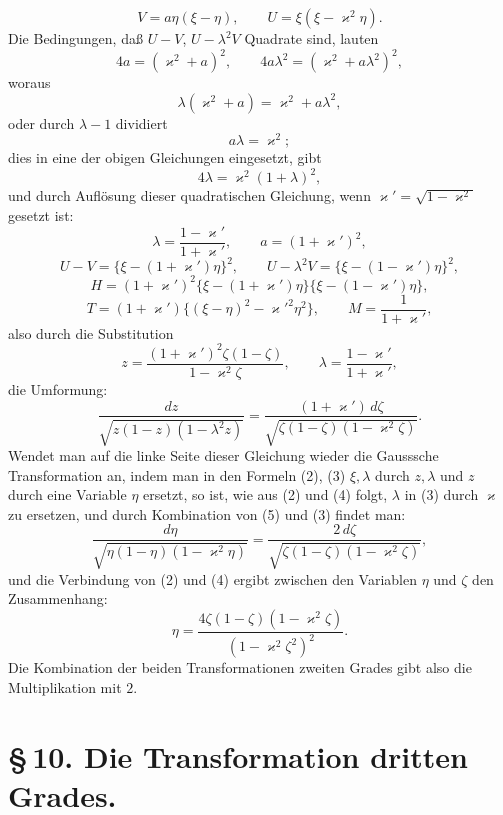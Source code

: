 \documentclass[11pt]{article}
\begin{document}
\[
V=a\eta(\xi-\eta),\qquad U=\xi(\xi-\varkappa^2\eta).
\]
Die Bedingungen, daß $U-V$, $U-\lambda^2V$ Quadrate sind, lauten
\[
4a=(\varkappa^2+a)^2,\qquad 4a\lambda^2=(\varkappa^2+a\lambda^2)^2,
\]
woraus
\[
\lambda(\varkappa^2+a)=\varkappa^2+a\lambda^2,
\]
oder durch $\lambda-1$ dividiert
\[
a\lambda=\varkappa^2;
\]
dies in eine der obigen Gleichungen eingesetzt, gibt
\[
4\lambda=\varkappa^2(1+\lambda)^2,
\]
und durch Auflösung dieser quadratischen Gleichung, wenn $\varkappa'=\sqrt{1-\varkappa^2}$ gesetzt ist:
\[
\lambda=\frac{1-\varkappa'}{1+\varkappa'},\qquad
a=(1+\varkappa')^2,
\]
\[
U-V=\{\xi-(1+\varkappa')\eta\}^2,\qquad
U-\lambda^2V=\{\xi-(1-\varkappa')\eta\}^2,
\]
\[
H=(1+\varkappa')^2\{\xi-(1+\varkappa')\eta\}\{\xi-(1-\varkappa')\eta\},
\]
\[
T=(1+\varkappa')\{(\xi-\eta)^2-\varkappa'^2\eta^2\},\qquad
M=\frac1{1+\varkappa'},
\]
also durch die Substitution
\begin{equation}
z=\frac{(1+\varkappa')^2\zeta(1-\zeta)}{1-\varkappa^2\zeta},
\qquad
\lambda=\frac{1-\varkappa'}{1+\varkappa'},
\tag{4}
\end{equation}
die Umformung:
\begin{equation}
\frac{dz}{\sqrt{z(1-z)(1-\lambda^2z)}}
=
\frac{(1+\varkappa')\,d\zeta}{\sqrt{\zeta(1-\zeta)(1-\varkappa^2\zeta)}}.
\tag{5}
\end{equation}
Wendet man auf die linke Seite dieser Gleichung wieder die Gausssche Transformation an, indem man in den Formeln (2), (3) $\xi,\lambda$ durch $z,\lambda$ und $z$ durch eine Variable $\eta$ ersetzt, so ist, wie aus (2) und (4) folgt, $\lambda$ in (3) durch $\varkappa$ zu ersetzen, und durch Kombination von (5) und (3) findet man:
\begin{equation}
\frac{d\eta}{\sqrt{\eta(1-\eta)(1-\varkappa^2\eta)}}
=
\frac{2\,d\zeta}{\sqrt{\zeta(1-\zeta)(1-\varkappa^2\zeta)}},
\tag{6}
\end{equation}
und die Verbindung von (2) und (4) ergibt zwischen den Variablen $\eta$ und $\zeta$ den Zusammenhang:
\begin{equation}
\eta=\frac{4\zeta(1-\zeta)(1-\varkappa^2\zeta)}
{(1-\varkappa^2\zeta^2)^2}.
\tag{7}
\end{equation}
Die Kombination der beiden Transformationen zweiten Grades gibt also die Multiplikation mit $2$.

\section*{\S\,10. Die Transformation dritten Grades.}
\end{document}
